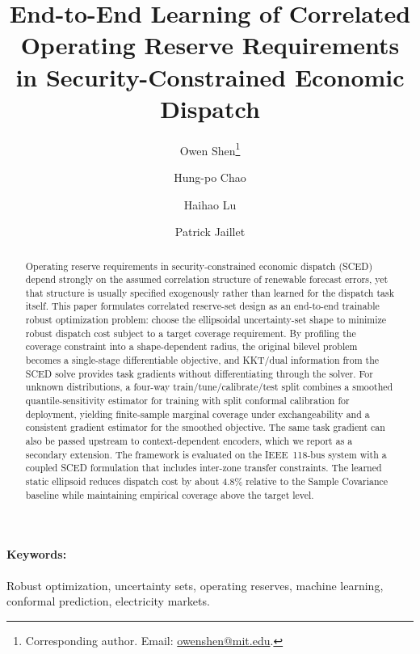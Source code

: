 \documentclass[11pt]{article}
\theoremstyle{definition}
\begin{document}
\title{End-to-End Learning of Correlated Operating Reserve Requirements in Security-Constrained Economic Dispatch}

\author[1]{Owen Shen\thanks{Corresponding author. Email: \href{mailto:owenshen@mit.edu}{owenshen@mit.edu}.}}
\author[2]{Hung-po Chao}
\author[1]{Haihao Lu}
\author[1]{Patrick Jaillet}


\date{}

\maketitle

\begin{abstract}
Operating reserve requirements in security-constrained economic dispatch (SCED) depend strongly on the assumed correlation structure of renewable forecast errors, yet that structure is usually specified exogenously rather than learned for the dispatch task itself. This paper formulates correlated reserve-set design as an end-to-end trainable robust optimization problem: choose the ellipsoidal uncertainty-set shape to minimize robust dispatch cost subject to a target coverage requirement. By profiling the coverage constraint into a shape-dependent radius, the original bilevel problem becomes a single-stage differentiable objective, and KKT/dual information from the SCED solve provides task gradients without differentiating through the solver. For unknown distributions, a four-way train/tune/calibrate/test split combines a smoothed quantile-sensitivity estimator for training with split conformal calibration for deployment, yielding finite-sample marginal coverage under exchangeability and a consistent gradient estimator for the smoothed objective. The same task gradient can also be passed upstream to context-dependent encoders, which we report as a secondary extension. The framework is evaluated on the IEEE~118-bus system with a coupled SCED formulation that includes inter-zone transfer constraints. The learned static ellipsoid reduces dispatch cost by about 4.8\% relative to the Sample Covariance baseline while maintaining empirical coverage above the target level.
\end{abstract}

\paragraph{Keywords:} Robust optimization, uncertainty sets, operating reserves, machine learning, conformal prediction, electricity markets.
\end{document}
